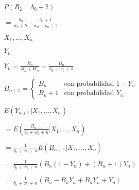 \documentclass[english]{article}
\theoremstyle{plain}
\def\lthtmlcheckvsize{\ifdim\ht\sizebox<\vsize 
  \ifdim\wd\sizebox<\hsize\expandafter\hfill\fi \expandafter\vfill
  \else\expandafter\vss\fi}%
\begin{document}
{\newpage\clearpage
{}%
$\displaystyle P\left(B_{2}=b_{0}+2\right)$%
\lthtmlindisplaymathZ
\lthtmlcheckvsize\clearpage}

{\newpage\clearpage
{}%
$\displaystyle =\frac{b_{0}}{w_{0}+b_{0}}\cdot\frac{b_{0}+1}{w_{0}+b_{0}+1}$%
\lthtmlindisplaymathZ
\lthtmlcheckvsize\clearpage}

{\newpage\clearpage
{}%
$ X_{1},\ldots,X_{n}$%
\lthtmlindisplaymathZ
\lthtmlcheckvsize\clearpage}

{\newpage\clearpage
{}%
$ Y_{n}$%
\lthtmlindisplaymathZ
\lthtmlcheckvsize\clearpage}

{\newpage\clearpage
{}%
$\displaystyle Y_{n}=\frac{B_{n}}{B_{n}+W_{n}}=\frac{B_{n}}{b_{0}+w_{0}+n}
$%
\lthtmlindisplaymathZ
\lthtmlcheckvsize\clearpage}

{\newpage\clearpage
{}%
$\displaystyle B_{n+1}=\begin{cases}
B_{n} & \text{con probabilidad }1-Y_{n}\\
B_{n}+1 & \text{con probabilidad }Y_{n}
\end{cases}
$%
\lthtmlindisplaymathZ
\lthtmlcheckvsize\clearpage}

{\newpage\clearpage
{}%
$\displaystyle E\left(Y_{n+1}|X_{1},\ldots,X_{n}\right)$%
\lthtmlindisplaymathZ
\lthtmlcheckvsize\clearpage}

{\newpage\clearpage
{}%
$\displaystyle =E\left(\frac{B_{n+1}}{b_{0}+w_{0}+n}|X_{1},\ldots,X_{n}\right)$%
\lthtmlindisplaymathZ
\lthtmlcheckvsize\clearpage}

{\newpage\clearpage
{}%
$\displaystyle =\frac{1}{b_{0}+w_{0}+n}E\left(B_{n+1}|X_{1},\ldots,X_{n}\right)$%
\lthtmlindisplaymathZ
\lthtmlcheckvsize\clearpage}

{\newpage\clearpage
{}%
$\displaystyle =\frac{1}{b_{0}+w_{0}+n}\left(B_{n}\left(1-Y_{n}\right)+\left(B_{n}+1\right)Y_{n}\right)$%
\lthtmlindisplaymathZ
\lthtmlcheckvsize\clearpage}

{\newpage\clearpage
{}%
$\displaystyle =\frac{1}{b_{0}+w_{0}+n}\left(B_{n}-B_{n}Y_{n}+B_{n}Y_{n}+Y_{n}\right)$%
\lthtmlindisplaymathZ
\lthtmlcheckvsize\clearpage}
\end{document}
